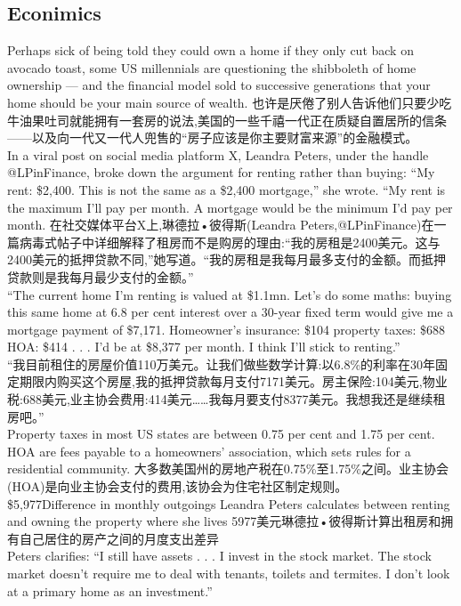 \documentclass[a4paper,12pt]{article}
\begin{document}
\subsection{Econimics}
Perhaps sick of being told they could own a home if they only cut back on avocado toast, some US millennials are questioning the shibboleth of home ownership — and the financial model sold to successive generations that your home should be your main source of wealth.
也许是厌倦了别人告诉他们只要少吃牛油果吐司就能拥有一套房的说法,美国的一些千禧一代正在质疑自置居所的信条——以及向一代又一代人兜售的“房子应该是你主要财富来源”的金融模式。
\\In a viral post on social media platform X, Leandra Peters, under the handle @LPinFinance, broke down the argument for renting rather than buying: “My rent: \$2,400. This is not the same as a \$2,400 mortgage,” she wrote. “My rent is the maximum I'll pay per month. A mortgage would be the minimum I'd pay per month.
在社交媒体平台X上,琳德拉•彼得斯(Leandra Peters,@LPinFinance)在一篇病毒式帖子中详细解释了租房而不是购房的理由:“我的房租是2400美元。这与2400美元的抵押贷款不同,”她写道。“我的房租是我每月最多支付的金额。而抵押贷款则是我每月最少支付的金额。”
\\“The current home I'm renting is valued at \$1.1mn. Let's do some maths: buying this same home at 6.8 per cent interest over a 30-year fixed term would give me a mortgage payment of \$7,171. Homeowner's insurance: \$104 property taxes: \$688 HOA: \$414 . . . I'd be at \$8,377 per month. I think I'll stick to renting.”
\\“我目前租住的房屋价值110万美元。让我们做些数学计算:以6.8\%的利率在30年固定期限内购买这个房屋,我的抵押贷款每月支付7171美元。房主保险:104美元,物业税:688美元,业主协会费用:414美元……我每月要支付8377美元。我想我还是继续租房吧。”
\\Property taxes in most US states are between 0.75 per cent and 1.75 per cent. HOA are fees payable to a homeowners' association, which sets rules for a residential community.
大多数美国州的房地产税在0.75\%至1.75\%之间。业主协会(HOA)是向业主协会支付的费用,该协会为住宅社区制定规则。
\\\$5,977Difference in monthly outgoings Leandra Peters calculates between renting and owning the property where she lives
5977美元琳德拉•彼得斯计算出租房和拥有自己居住的房产之间的月度支出差异
\\Peters clarifies: “I still have assets . . . I invest in the stock market. The stock market doesn't require me to deal with tenants, toilets and termites. I don't look at a primary home as an investment.”
\end{document}
